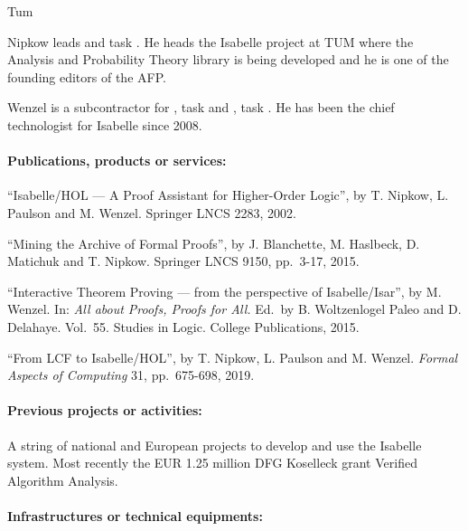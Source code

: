 \begin{sitedescription}{Tum}
\begin{compactitem}
\item Nipkow leads  and task 
  . 
He heads the Isabelle project at TUM where the Analysis and 
Probability Theory library is being developed and he is one of the 
founding editors of the AFP. 
\item Wenzel is a subcontractor for , task
   and , task
  .
  He has been the chief technologist for Isabelle since 2008.
\end{compactitem}

\paragraph*{Publications, products or services:}

\begin{compactitem}
\item ``Isabelle/HOL --- A Proof Assistant for Higher-Order Logic'',
  by T. Nipkow, L. Paulson and M. Wenzel. Springer LNCS 2283, 2002.
\item ``Mining the Archive of Formal Proofs'', by J. Blanchette,
  M. Haslbeck, D. Matichuk and T. Nipkow. Springer LNCS 9150, pp.\ 3-17, 2015.
\item ``Interactive Theorem Proving --- from the perspective of Isabelle/Isar'',
by M. Wenzel. In: \emph{All about Proofs, Proofs for All.} Ed.\ by B. Woltzenlogel Paleo and D. Delahaye. Vol.\ 55. Studies in Logic. College Publications, 2015.
\item ``From LCF to Isabelle/HOL'', by T. Nipkow, L. Paulson and M. Wenzel.
\emph{Formal Aspects of Computing} 31, pp.\ 675-698, 2019.
\end{compactitem}

\paragraph*{Previous projects or activities:}

\begin{compactitem}
\item A string of national and European projects to develop and use the Isabelle
system. Most recently the EUR 1.25 million DFG Koselleck grant Verified Algorithm Analysis.
\end{compactitem}

\paragraph*{Infrastructures or technical equipments:}


\end{sitedescription}
